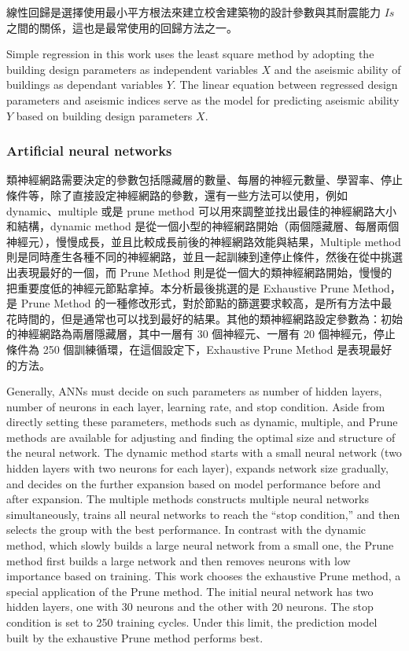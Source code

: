 線性回歸是選擇使用最小平方根法來建立校舍建築物的設計參數與其耐震能力 $Is$ 之間的關係，這也是最常使用的回歸方法之一。

Simple regression in this work uses the least square method by adopting the building design parameters as independent variables $X$ and the aseismic ability of buildings as dependant variables $Y$. The linear equation between regressed design parameters and aseismic indices serve as the model for predicting aseismic ability $Y$ based on building design parameters $X$.

\subsubsection{Artificial neural networks}

類神經網路需要決定的參數包括隱藏層的數量、每層的神經元數量、學習率、停止條件等，除了直接設定神經網路的參數，還有一些方法可以使用，例如 dynamic、multiple 或是 prune method 可以用來調整並找出最佳的神經網路大小和結構，dynamic method 是從一個小型的神經網路開始（兩個隱藏層、每層兩個神經元），慢慢成長，並且比較成長前後的神經網路效能與結果，Multiple method 則是同時產生各種不同的神經網路，並且一起訓練到達停止條件，然後在從中挑選出表現最好的一個，而 Prune Method 則是從一個大的類神經網路開始，慢慢的把重要度低的神經元節點拿掉。本分析最後挑選的是 Exhaustive Prune Method，是 Prune Method 的一種修改形式，對於節點的篩選要求較高，是所有方法中最花時間的，但是通常也可以找到最好的結果。其他的類神經網路設定參數為：初始的神經網路為兩層隱藏層，其中一層有 30 個神經元、一層有 20 個神經元，停止條件為 250 個訓練循環，在這個設定下，Exhaustive Prune Method 是表現最好的方法。

Generally, ANNs must decide on such parameters as number of hidden layers, number of neurons in each layer, learning rate, and stop condition. Aside from directly setting these parameters, methods such as dynamic, multiple, and Prune methods are available for adjusting and finding the optimal size and structure of the neural network. The dynamic method starts with a small neural network (two hidden layers with two neurons for each layer), expands network size gradually, and decides on the further expansion based on model performance before and after expansion. The multiple methods constructs multiple neural networks simultaneously, trains all neural networks to reach the ``stop condition,'' and then selects the group with the best performance. In contrast with the dynamic method, which slowly builds a large neural network from a small one, the Prune method first builds a large network and then removes neurons with low importance based on training. This work chooses the exhaustive Prune method, a special application of the Prune method. The initial neural network has two hidden layers, one with 30 neurons and the other with 20 neurons. The stop condition is set to 250 training cycles. Under this limit, the prediction model built by the exhaustive Prune method performs best.


